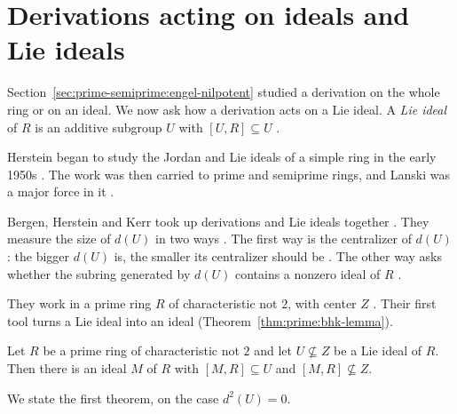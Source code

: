 \section{Derivations acting on ideals and Lie ideals}\label{sec:prime-semiprime:ideals-lie-ideals}

Section~\ref{sec:prime-semiprime:engel-nilpotent} studied a derivation on the
whole ring or on an ideal. We now ask how a derivation acts on a Lie ideal. A
\emph{Lie ideal} of $R$ is an additive subgroup $U$ with $[U,R]\subseteq U$
\cite[p.~280]{Lanski1988}.

Herstein began to study the Jordan and Lie
ideals of a simple ring in the early 1950s \cite[p.~14]{MartindaleMiers1986}. The
work was then carried to prime and semiprime rings, and Lanski was a major force
in it \cite[p.~14]{MartindaleMiers1986}.

Bergen, Herstein and Kerr took up derivations and Lie ideals together
\cite[p.~259]{BergenHersteinKerr1981}. They measure the size of $d(U)$ in two
ways \cite[p.~259]{BergenHersteinKerr1981}. The first way is the centralizer of $d(U)$: the bigger $d(U)$ is, the smaller its
centralizer should be \cite[p.~259]{BergenHersteinKerr1981}. The other way asks
whether the subring generated by $d(U)$ contains a nonzero ideal of $R$
\cite[p.~259]{BergenHersteinKerr1981}.

They work in a prime ring $R$ of characteristic not $2$, with center $Z$
\cite[p.~260]{BergenHersteinKerr1981}. Their first tool turns a Lie ideal into an
ideal (Theorem~\ref{thm:prime:bhk-lemma}).

\begin{theorem}\label{thm:prime:bhk-lemma}
Let $R$ be a prime ring of characteristic not $2$ and let $U\not\subseteq Z$ be a
Lie ideal of $R$. Then there is an ideal $M$ of $R$ with $[M,R]\subseteq U$ and
$[M,R]\not\subseteq Z$.
\end{theorem}

We state the first theorem, on the case $d^2(U)=0$.

